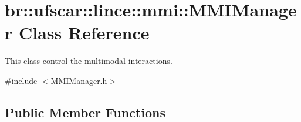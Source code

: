\hypertarget{classbr_1_1ufscar_1_1lince_1_1mmi_1_1MMIManager}{
\section{br::ufscar::lince::mmi::MMIManager Class Reference}
\label{classbr_1_1ufscar_1_1lince_1_1mmi_1_1MMIManager}
}


This class control the multimodal interactions.  




{\ttfamily \#include $<$MMIManager.h$>$}

\subsection*{Public Member Functions}
